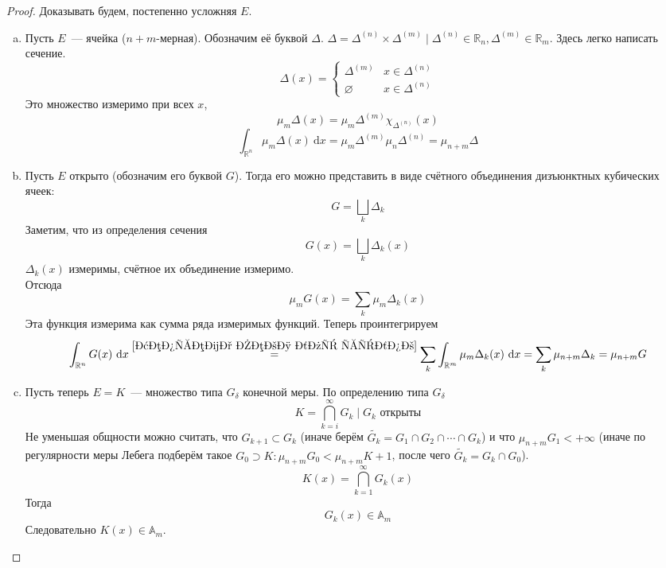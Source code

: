 \documentclass{article}
\begin{document}
    \begin{proof}
        Доказывать будем, постепенно усложняя $E$.
        \begin{enumerate}[a.]
            \item Пусть $E$~--- ячейка ($n+m$-мерная). Обозначим её буквой $\Delta$. $\Delta=\Delta^{(n)}\times\Delta^{(m)}\mid \Delta^{(n)}\in\mathbb R_n,\Delta^{(m)}\in\mathbb R_m$. Здесь легко написать сечение.
            $$\Delta(x)=\begin{cases}
                \Delta^{(m)} & x\in\Delta^{(n)}\\
                \varnothing & x\in\Delta^{(n)}
            \end{cases}$$
            Это множество измеримо при всех $x$,
            $$\mu_m\Delta(x)=\mu_m\Delta^{(m)}\chi_{\Delta^{(n)}}(x)$$
            $$
            \int_{\mathbb R^n}\mu_m\Delta(x)~\mathrm dx=\mu_m\Delta^{(m)}\mu_n\Delta^{(n)}=\mu_{n+m}\Delta
            $$
            \item Пусть $E$ открыто (обозначим его буквой $G$). Тогда его можно представить в виде счётного объединения дизъюнктных кубических ячеек:
            $$
            G=\bigsqcup\limits_k\Delta_k
            $$
            Заметим, что из определения сечения
            $$
            G(x)=\bigsqcup\limits_k\Delta_k(x)
            $$
            $\Delta_k(x)$ измеримы, счётное их объединение измеримо.\\
            Отсюда
            $$
            \mu_mG(x)=\sum\limits_k\mu_m\Delta_k(x)
            $$
            Эта функция измерима как сумма ряда измеримых функций. Теперь проинтегрируем
            $$
            \int_{\mathbb R^n}G(x)~\mathrm dx\overset{\ref{Теорема Леви для рядов}}=\sum\limits_k\int_{\mathbb R^m}\mu_m\Delta_k(x)~\mathrm dx=\sum\limits_k\mu_{n+m}\Delta_k=\mu_{n+m}G
            $$
            \item Пусть теперь $E=K$~--- множество типа $G_\delta$ конечной меры. По определению типа $G_\delta$
            $$
            K=\bigcap\limits_{k=i}^\infty G_k\mid G_k\text{ открыты}
            $$
            Не уменьшая общности можно считать, что $G_{k+1}\subset G_k$ (иначе берём $\widetilde{G_k}=G_1\cap G_2\cap\cdots\cap G_k$) и что $\mu_{n+m}G_1<+\infty$ (иначе по регулярности меры Лебега подберём такое $G_0\supset K:\mu_{n+m}G_0<\mu_{n+m}K+1$, после чего $\widetilde{G_k}=G_k\cap G_0$).
            $$
            K(x)=\bigcap\limits_{k=1}^\infty G_k(x)
            $$
            Тогда
            $$
            G_k(x)\in\mathbb A_m
            $$
            Следовательно $K(x)\in\mathbb A_m$.\\

\end{enumerate}
\end{proof}
\end{document}
